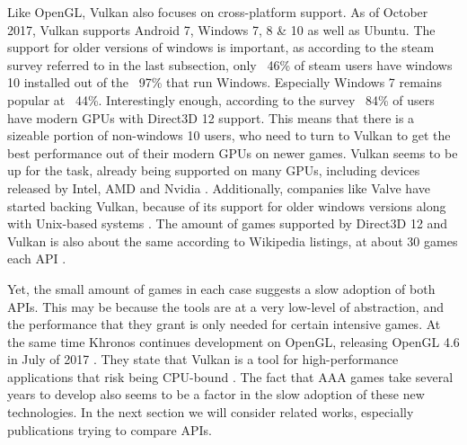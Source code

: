 Like OpenGL, Vulkan also focuses on cross-platform support.
As of October 2017, Vulkan supports Android 7, Windows 7, 8 \& 10 as well as Ubuntu\cite{vulkanConformance}.
The support for older versions of windows is important, as according to the steam survey referred to in the last subsection, only ~46\% of steam users have windows 10 installed out of the ~97\% that run Windows\cite{steamStats}.
Especially Windows 7 remains popular at ~44\%. Interestingly enough, according to the survey ~84\% of users have modern \glspl{GPU} with Direct3D 12 support.
This means that there is a sizeable portion of non-windows 10 users, who need to turn to Vulkan to get the best performance out of their modern \glspl{GPU} on newer games.
Vulkan seems to be up for the task, already being supported on many \glspl{GPU}, including devices released by Intel, AMD and Nvidia \cite{vulkanConformance}.
Additionally, companies like Valve have started backing Vulkan, because of its support for older windows versions along with Unix-based systems \cite{siggraph2015}.
The amount of games supported by Direct3D 12 and Vulkan is also about the same according to Wikipedia listings, at about 30 games each \gls{API} \cite{wikiVulkanGames} \cite{wikiDX12Games}.

Yet, the small amount of games in each case suggests a slow adoption of both \glspl{API}.
This may be because the tools are at a very low-level of abstraction, and the performance that they grant is only needed for certain intensive games.
At the same time Khronos continues development on OpenGL, releasing OpenGL 4.6 in July of 2017 \cite{wikiOpenGL}.
They state that Vulkan is a tool for high-performance applications that risk being CPU-bound \cite{vulkanPresentationFeb2016}. 
The fact that AAA games take several years to develop also seems to be a factor in the slow adoption of these new technologies.
In the next section we will consider related works, especially publications trying to compare \glspl{API}. 

